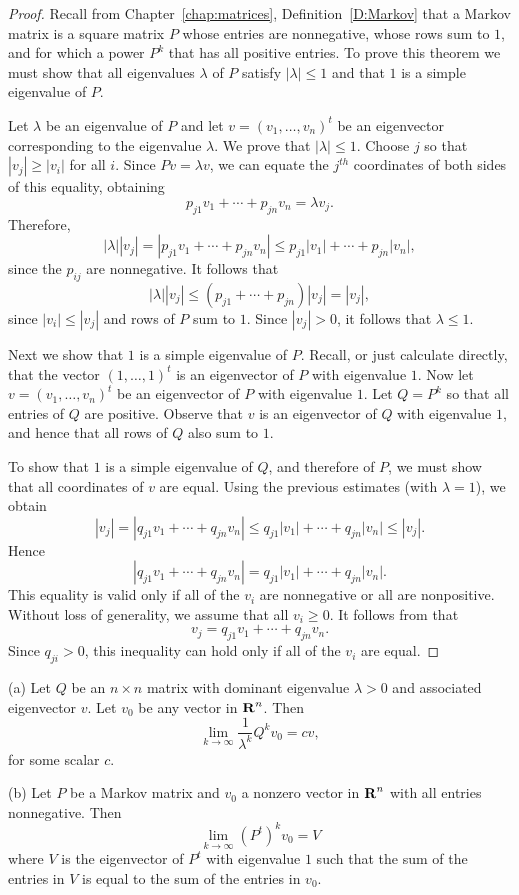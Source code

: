 \documentclass{ximera}
\begin{document}
\begin{proof}  Recall from Chapter~\ref{chap:matrices}, Definition~\ref{D:Markov} 
that a Markov matrix is a square matrix $P$ whose entries are nonnegative, 
whose rows sum to $1$, and for which a power $P^k$ that has all positive 
entries.  To prove this theorem we must show that all eigenvalues $\lambda$ 
of $P$ satisfy $|\lambda|\leq 1$ and that $1$ is a simple eigenvalue of $P$.

Let $\lambda$ be an eigenvalue of $P$ and let $v=(v_1,\ldots,v_n)^t$ be an 
eigenvector corresponding to the eigenvalue $\lambda$.  We prove that 
$|\lambda|\leq 1$.  Choose $j$ so that $|v_j|\ge|v_i|$ for all $i$.  Since 
$Pv=\lambda v$, we can equate the $j^{th}$ coordinates of both sides of 
this equality, obtaining
\[
p_{j1}v_1 + \cdots + p_{jn}v_n = \lambda v_j.
\]
Therefore,
\[
 |\lambda| |v_j| = |p_{j1}v_1 + \cdots + p_{jn}v_n| \leq 
p_{j1}|v_1| + \cdots + p_{jn}|v_n|,
\]
since the $p_{ij}$ are nonnegative.  It follows that 
\[
|\lambda| |v_j| \leq (p_{j1}+\cdots+p_{jn})|v_j| =|v_j|,
\]
since $|v_i|\le|v_j|$ and rows of $P$ sum to $1$.  Since $|v_j|>0$, it 
follows that $\lambda\leq 1$.

Next we show that $1$ is a simple eigenvalue of $P$.  Recall, or just 
calculate directly, that the vector $(1,\ldots,1)^t$ is an eigenvector of $P$ 
with eigenvalue $1$.  Now let $v=(v_1,\ldots,v_n)^t$ be an eigenvector of $P$ 
with eigenvalue $1$.  Let $Q=P^k$ so that all entries of $Q$ are positive. 
Observe that $v$ is an eigenvector of $Q$ with eigenvalue $1$, and hence that 
all rows of $Q$ also sum to $1$.

To show that $1$ is a simple eigenvalue of $Q$, and therefore of $P$, we must 
show that all coordinates of $v$ are equal.  Using the previous estimates 
(with $\lambda=1$), we obtain 
\begin{equation}  \label{E:ineqM}
|v_j|= |q_{j1}v_1 + \cdots + q_{jn}v_n| \leq  q_{j1}|v_1| + \cdots + 
q_{jn}|v_n| \leq |v_j|.
\end{equation}
Hence 
\[
|q_{j1}v_1 + \cdots + q_{jn}v_n| =  q_{j1}|v_1| + \cdots + q_{jn}|v_n|.
\]
This equality is valid only if all of the $v_i$ are nonnegative or all are 
nonpositive.  Without loss of generality, we assume that all $v_i\geq 0$.
It follows from  that 
\[
v_j= q_{j1}v_1 + \cdots + q_{jn}v_n.
\]
Since $q_{ji}>0$, this inequality can hold only if all of the $v_i$ are
equal.  \end{proof}


\begin{thm} \label{T:convergetoeig}
(a)  Let $Q$ be an $n\times n$ matrix with dominant eigenvalue 
$\lambda>0$ and associated eigenvector $v$.  Let $v_0$ be any vector in 
$\mbox{$\bf{R}$}^n$.  Then
\[
\lim_{k\to\infty}\frac{1}{\lambda^k}Q^kv_0 = cv,
\]
for some scalar $c$.

(b)  Let $P$ be a Markov matrix and $v_0$ a nonzero vector in $\mbox{$\bf{R}$}^n$
with all entries nonnegative.  Then 
\[
\lim_{k\to\infty}(P^t)^kv_0 = V
\]
where $V$ is the eigenvector of $P^t$ with eigenvalue $1$ such that the 
sum of the entries in $V$ is equal to the sum of the entries in $v_0$.
\end{thm} 
\end{document}
